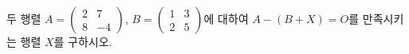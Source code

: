 두 행렬 $A=\begin{pmatrix} 2 & 7 \\ 8 & -4 \end{pmatrix}$, $B=\begin{pmatrix} 1 & 3 \\ 2 & 5 \end{pmatrix}$에 대하여 $A-(B+X)=O$를 만족시키는 행렬 $X$를 구하시오. 
